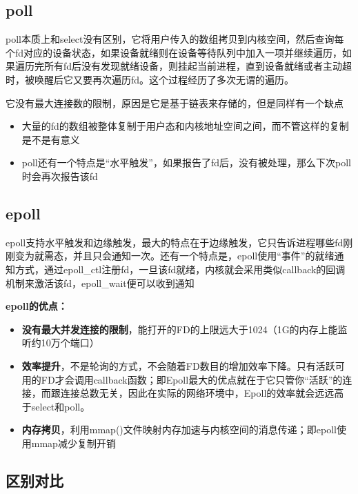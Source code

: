\documentclass[UTF8,a4paper,8pt]{ctexbook}
\begin{document}
		\subsection{poll}
			poll本质上和select没有区别，它将用户传入的数组拷贝到内核空间，然后查询每个fd对应的设备状态，如果设备就绪则在设备等待队列中加入一项并继续遍历，如果遍历完所有fd后没有发现就绪设备，则挂起当前进程，直到设备就绪或者主动超时，被唤醒后它又要再次遍历fd。这个过程经历了多次无谓的遍历。
		
			它没有最大连接数的限制，原因是它是基于链表来存储的，但是同样有一个缺点
			\begin{itemize}
				\item  大量的fd的数组被整体复制于用户态和内核地址空间之间，而不管这样的复制是不是有意义
				\item  poll还有一个特点是“水平触发”，如果报告了fd后，没有被处理，那么下次poll时会再次报告该fd
			\end{itemize}
		
		\subsection{epoll}
			epoll支持水平触发和边缘触发，最大的特点在于边缘触发，它只告诉进程哪些fd刚刚变为就需态，并且只会通知一次。还有一个特点是，epoll使用“事件”的就绪通知方式，通过epoll\_ctl注册fd，一旦该fd就绪，内核就会采用类似callback的回调机制来激活该fd，epoll\_wait便可以收到通知
			
			\textbf{epoll的优点：}
			\begin{itemize}
				\item \textbf{没有最大并发连接的限制}，能打开的FD的上限远大于1024（1G的内存上能监听约10万个端口）
				
				\item \textbf{效率提升}，不是轮询的方式，不会随着FD数目的增加效率下降。只有活跃可用的FD才会调用callback函数；即Epoll最大的优点就在于它只管你“活跃”的连接，而跟连接总数无关，因此在实际的网络环境中，Epoll的效率就会远远高于select和poll。
				
				\item \textbf{内存拷贝}，利用mmap()文件映射内存加速与内核空间的消息传递；即epoll使用mmap减少复制开销
			\end{itemize}
		
		\subsection{区别对比}
\end{document}
